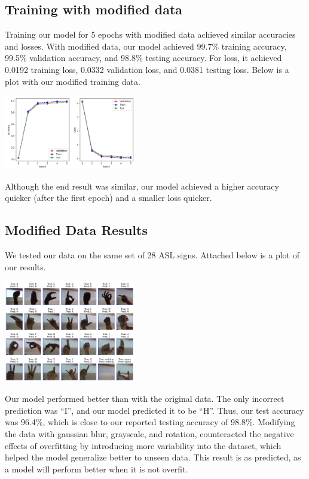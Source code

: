 \documentclass[10pt,twocolumn,letterpaper]{article}
\begin{document}
\subsection{Training with modified data}
Training our model for 5 epochs with modified data achieved similar accuracies and losses.
With modified data, our model achieved 99.7\% training accuracy, 99.5\% validation accuracy, and 98.8\%
testing accuracy. For loss, it achieved 0.0192 training loss, 0.0332 validation loss, and 0.0381
testing loss. Below is a plot with our modified training data. 

\begin{center}
    \includegraphics[width=0.43\textwidth]{../writeup_imgs/model2Plot.png}
\end{center}

Although the end result was similar, our model achieved a higher accuracy quicker 
(after the first epoch) and a smaller loss quicker. 

\subsection{Modified Data Results}
We tested our data on the same set of 28 ASL signs. Attached below is a plot of our results.

\begin{center}
    \includegraphics[width=0.43\textwidth]{../writeup_imgs/test_modified.png}
\end{center}

Our model performed better than with the original data. The only incorrect prediction was
“I”, and our model predicted it to be “H”. Thus, our test accuracy was 96.4\%, which is close
to our reported testing accuracy of 98.8\%. Modifying the data with gaussian blur, grayscale,
and rotation, counteracted the negative effects of overfitting by introducing more variability
into the dataset, which helped the model generalize better to unseen data. This result is as
predicted, as a model will perform better when it is not overfit. 
\end{document}
